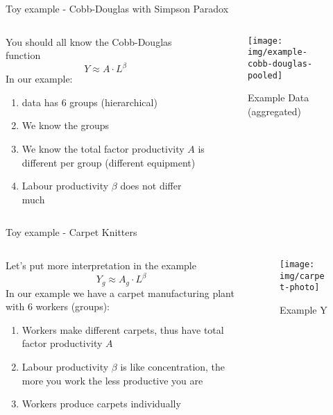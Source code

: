 \documentclass{beamer}
\begin{document}
\begin{frame}{Toy example - Cobb-Douglas with Simpson Paradox}
\begin{columns}
\begin{column}{0.5\linewidth}
You should all know the Cobb-Douglas function
\begin{equation*}
    Y \approx A \cdot L ^ \beta
\end{equation*}
In our example:
\begin{enumerate}
    \item data has 6 groups (hierarchical)
    \item We know the groups
    \item We know the total factor productivity $A$ is different per group (different equipment)
    \item Labour productivity $\beta$ does not differ much
\end{enumerate}
\end{column}
\begin{column}{0.5\linewidth}
\begin{figure}
    \centering
    \texttt{[image: img/example-cobb-douglas-pooled]}
    \caption{Example Data (aggregated)}
\end{figure}
\end{column}
\end{columns}
\end{frame}
\begin{frame}{Toy example - Carpet Knitters}
\begin{columns}
\begin{column}{0.5\linewidth}
Let's put more interpretation in the example
\begin{equation*}
    Y_g \approx A_g \cdot L ^ \beta
\end{equation*}
In our example we have a carpet manufacturing plant with 6 workers (groups):
\begin{enumerate}
    \item Workers make different carpets, thus have total factor productivity $A$
    \item Labour productivity $\beta$ is like concentration, the more you work the less productive you are
    \item Workers produce carpets individually
\end{enumerate}
\end{column}
\begin{column}{0.5\linewidth}
\begin{figure}
    \centering
    \texttt{[image: img/carpet-photo]}
    \caption{Example Y}
\end{figure}
\end{column}
\end{columns}
\end{frame}
\end{document}
